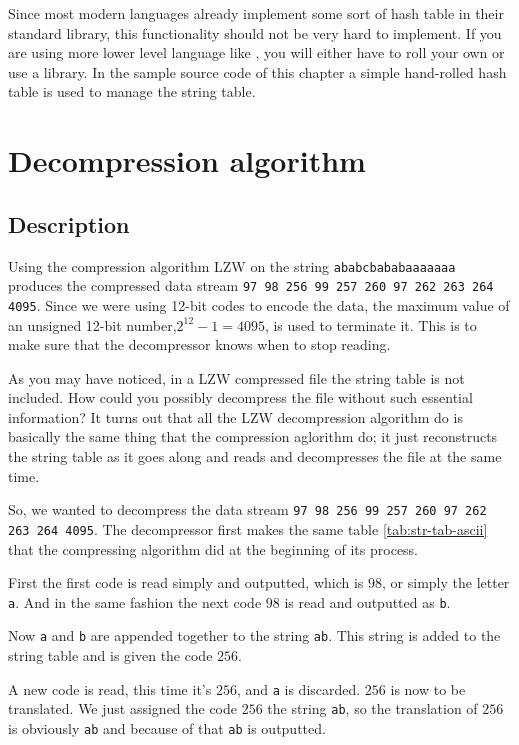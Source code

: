 \begin{refsection}
Since most modern languages already implement some sort of hash table
in their standard library, this functionality should not be very hard
to implement. If you are using more lower level language like \C, you
will either have to roll your own or use a library. In the sample \C
source code of this chapter a simple hand-rolled hash table
is used to manage the string table.

\section{Decompression algorithm}

\subsection{Description}

Using the compression algorithm LZW on the string
\texttt{ababcbababaaaaaaa} produces the compressed data stream
\texttt{97 98 256 99 257 260 97 262 263 264 4095}. Since we were using
12-bit codes to encode the data, the maximum value of an unsigned
12-bit number,$2^{12} - 1 = 4095$, is used to terminate it. This is to
make sure that the decompressor knows when to stop reading.

As you may have noticed, in a LZW compressed file the string table is
not included. How could you possibly decompress the file without such
essential information? It turns out that all the LZW decompression
algorithm do is basically the same thing that the compression aglorithm do; it
just reconstructs the string table as it goes along and  reads and decompresses the
file at the same time.

So, we wanted to decompress the data stream \texttt{97 98 256 99 257
  260 97 262 263 264 4095}. The decompressor first makes the same
table \ref{tab:str-tab-ascii}  that the \lzw compressing algorithm did at the beginning of
its process.

First the first code is read simply and outputted, which is $98$, or
simply the letter \texttt{a}. And in the same fashion the next code
$98$ is read and outputted as \texttt{b}.

Now \texttt{a} and \texttt{b} are appended together to the string
\texttt{ab}. This string is added to the string table and is given the
code $256$.

A new code is read, this time it's $256$, and \texttt{a} is
discarded. $256$ is now to be translated. We just assigned the code
$256$ the string \texttt{ab}, so the translation of $256$ is obviously
\texttt{ab} and because of that \texttt{ab} is outputted.


\end{refsection}
